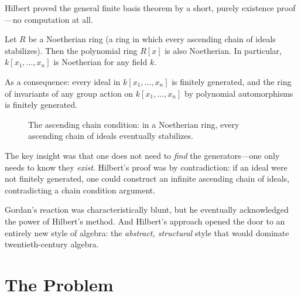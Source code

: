 Hilbert proved the general finite basis theorem by a short, purely existence proof---no computation at all.

\begin{theorem}
\label{thm:hilbert-basis}
Let $R$ be a Noetherian ring (a ring in which every ascending chain of ideals stabilizes). Then the polynomial ring $R[x]$ is also Noetherian. In particular, $k[x_1, \ldots, x_n]$ is Noetherian for any field $k$.

As a consequence: every ideal in $k[x_1, \ldots, x_n]$ is finitely generated, and the ring of invariants of any group action on $k[x_1, \ldots, x_n]$ by polynomial automorphisms is finitely generated.
\end{theorem}

\begin{figure}[htbp]
\centering
{}
\caption{The ascending chain condition: in a Noetherian ring, every ascending chain of ideals eventually stabilizes.}
\label{fig:acc}
\end{figure}

The key insight was that one does not need to \emph{find} the generators---one only needs to know they \emph{exist}. Hilbert's proof was by contradiction: if an ideal were not finitely generated, one could construct an infinite ascending chain of ideals, contradicting a chain condition argument.

Gordan's reaction was characteristically blunt, but he eventually acknowledged the power of Hilbert's method. And Hilbert's approach opened the door to an entirely new style of algebra: the \emph{abstract, structural} style that would dominate twentieth-century algebra.

\section{The Problem}

